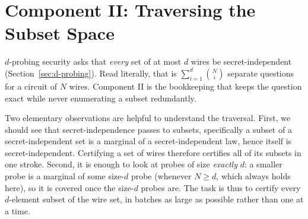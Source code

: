 


\section{Component II: Traversing the Subset Space}
\label{sec:subset-space}

$d$-probing security asks that \emph{every} set of at most $d$ wires be
secret-independent (Section~\ref{sec:d-probing}). Read literally, that is
$\sum_{i=1}^{d} \binom{N}{i}$ separate questions for a circuit of $N$ wires.
Component II is the
bookkeeping that keeps the question exact while never enumerating a subset
redundantly.

Two elementary observations are helpful to understand the traversal.
First, we should see that secret-independence passes to
subsets, specifically a subset of a secret-independent set is a marginal of a
secret-independent law, hence itself is secret-independent. Certifying a set
of wires therefore certifies all of its subsets in one stroke. 
Second, it is enough to look at probes of size
\emph{exactly} $d$: a smaller probe is a marginal of some size-$d$ probe
(whenever $N \ge d$, which always holds here), so it is covered once the size-$d$
probes are. The task is thus to certify every $d$-element subset of the wire set,
in batches as large as possible rather than one at a time.

